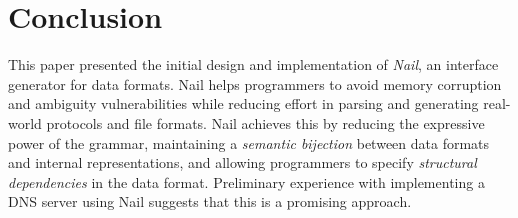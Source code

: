 \section{Conclusion}
\label{s:concl}

This paper presented the initial design and implementation of
\textit{Nail}, an interface generator for data formats.  Nail helps
programmers to avoid memory corruption and ambiguity vulnerabilities
while reducing effort in parsing and generating real-world protocols
and file formats.  Nail achieves this by reducing the expressive
power of the grammar, maintaining a \emph{semantic bijection} between
data formats and internal representations, and allowing programmers to
specify \emph{structural dependencies} in the data format.  Preliminary
experience with implementing a DNS server using Nail suggests that this
is a promising approach.


